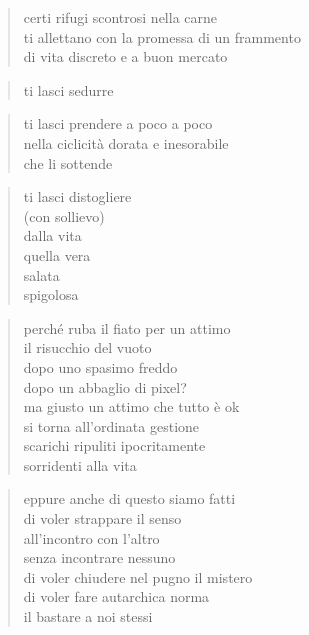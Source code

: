
	\begin{verse}
                certi rifugi scontrosi nella carne\\
                ti allettano con la promessa di un frammento\\
                di vita discreto e a buon mercato
	\end{verse}

	\begin{verse}
                ti lasci sedurre
	\end{verse}

	\begin{verse}
                ti lasci prendere a poco a poco\\
                nella ciclicità dorata e inesorabile\\
                che li sottende
	\end{verse}

	\begin{verse}
                ti lasci distogliere\\
                (con sollievo)\\
                dalla vita\\
                quella vera\\
                salata\\
                spigolosa
	\end{verse}

\clearpage


	\begin{verse}
		perché ruba il fiato per un attimo\\
		il risucchio del vuoto\\
		dopo uno spasimo freddo\\
		dopo un abbaglio di pixel?\\
		ma giusto un attimo che tutto è ok\\
		si torna all'ordinata gestione\\
		scarichi ripuliti ipocritamente\\
		sorridenti alla vita
	\end{verse}

	\begin{verse}
		eppure anche di questo siamo fatti\\
		di voler strappare il senso\\
		all'incontro con l'altro\\
		senza incontrare nessuno\\
		di voler chiudere nel pugno il mistero\\
		di voler fare autarchica norma\\
		il bastare a noi stessi
	\end{verse}

